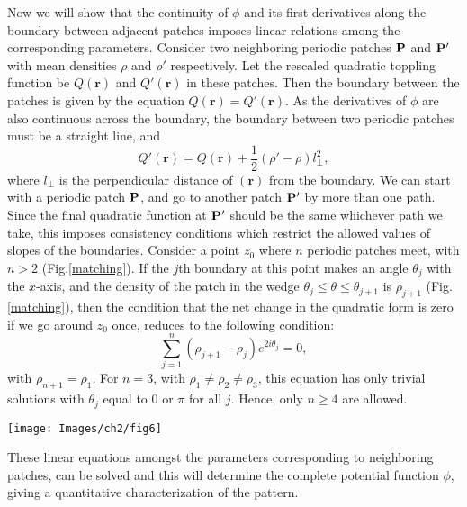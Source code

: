 \documentclass[11pt,a4paper]{book}
\begin{document}
Now we will show that the continuity of $\phi$ and its first
derivatives along the boundary between adjacent patches imposes linear
relations among the corresponding parameters. Consider two neighboring periodic patches ${\bf P}$ and ${\bf P'}$ 
with mean densities $\rho$ and $\rho'$ respectively. Let the rescaled quadratic 
toppling function be $Q(\mathbf{r})$ and $Q'(\mathbf{r})$ in these 
patches. Then the boundary between the patches is given by the equation 
$Q(\mathbf{r}) = Q'(\mathbf{r})$. As the derivatives of $\phi$ are also 
continuous across the boundary, the boundary between two periodic 
patches must be a straight line, and
\begin{equation} 
Q'(\mathbf{r}) = Q(\mathbf{r})+\frac{1}{2}(\rho'-\rho) l_{\perp}^2,  
\label{continuity}
\end{equation} 
where $l_\perp$ is the perpendicular distance of $(\mathbf{r})$ from the 
boundary. We can start with a periodic patch ${\bf P}$, and go to another 
patch ${\bf P'}$ by more than one path. Since the final quadratic function at 
${\bf P'}$ should be the same whichever path we take, this imposes consistency 
conditions which restrict the allowed values of slopes of the boundaries. 
Consider a point $z_0$ where $n$ periodic patches meet, with $n > 2$
(Fig.\ref{matching}). If the $j$th boundary at this point makes an angle 
$\theta_j$ with the $x$-axis, and the density of the patch in the wedge 
$\theta_j \le \theta \le \theta_{j+1}$ is $\rho_{j+1}$ (Fig.\ref{matching}), 
then the condition that the net change in the quadratic form is zero if we 
go around $z_0$ once, reduces to the following condition:
\begin{equation}
\sum_{j=1}^n  (\rho_{j+1} -\rho_{j}) e^{ 2 i \theta_j}  =0,
\end{equation}
with $\rho_{n+1}=\rho_1$.
For $n=3$, with $\rho_1 \neq \rho_2 \neq \rho_3$, this equation has
only trivial solutions with $\theta_{j}$ equal to $0$ or $\pi$ for all
$j$. Hence, only  $n \geq 4$ are allowed.
\begin{SCfigure}
 \texttt{[image: Images/ch2/fig6]}
 \caption{$n$ different periodic patches of density
 $\rho_1$,$...$,$\rho_n$ meeting at point $z_0$.}
 \label{matching}
\end{SCfigure}

These linear equations amongst the parameters corresponding to
neighboring patches, can be solved and this will determine the
complete potential function $\phi$, giving a quantitative characterization of
the pattern.
\end{document}
